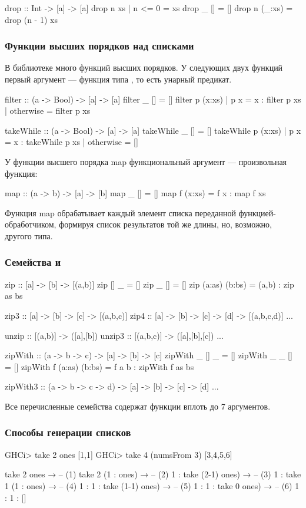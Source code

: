 \documentclass[11pt,a4paper]{article}
\begin{document}
\begin{hscode}
drop :: Int -> [a] -> [a]
drop n xs | n <= 0 = xs
drop _ []          = []
drop n (_:xs)      = drop (n - 1) xs
\end{hscode}

\subsubsection{Функции высших порядков над списками}
В библиотеке  много функций высших порядков. У следующих двух функций первый аргумент --- функция типа , то есть унарный предикат.
\begin{hscode}
filter :: (a -> Bool) -> [a] -> [a]
filter _ [] = []
filter p (x:xs) 
  | p x = x : filter p xs
  | otherwise = filter p xs

takeWhile :: (a -> Bool) -> [a] -> [a]
takeWhile _ [] = []
takeWhile p (x:xs)
  | p x = x : takeWhile p xs
  | otherwise = []
\end{hscode}
У функции высшего порядка map функциональный аргумент — произвольная функция:
\begin{hscode}
map :: (a -> b) -> [a] -> [b]
map _ [] = []
map f (x:xs) = f x : map f xs
\end{hscode}

Функция map обрабатывает каждый элемент списка переданной функцией-обработчиком, формируя список результатов той же длины, но, возможно, другого типа.
\subsubsection{Семейства  и }
\begin{hscode}
zip :: [a] -> [b] -> [(a,b)]
zip [] _ = []
zip _ [] = []
zip (a:as) (b:bs) = (a,b) : zip as bs

zip3 :: [a] -> [b] -> [c] -> [(a,b,c)]
zip4 :: [a] -> [b] -> [c] -> [d] -> [(a,b,c,d)]
...

unzip :: [(a,b)] -> ([a],[b])
unzip3 :: [(a,b,c)] -> ([a],[b],[c])
...

zipWith :: (a -> b -> c) -> [a] -> [b] -> [c]
zipWith _ [] _ = []
zipWith _ _ [] = []
zipWith f (a:as) (b:bs) = f a b : zipWith f as bs

zipWith3 :: (a -> b -> c -> d) -> [a] -> [b] -> [c] -> [d]
...
\end{hscode}
Все перечисленные семейства содержат функции вплоть до 7 аргументов.
\subsubsection{Способы генерации списков}
\begin{hscode}
GHCi> take 2 ones
[1,1]
GHCi> take 4 (numsFrom 3)
[3,4,5,6]

take 2 ones → -- (1)
take 2 (1 : ones) → -- (2)
1 : take (2-1) ones) → -- (3)
1 : take 1 (1 : ones) → -- (4)
1 : 1 : take (1-1) ones) → -- (5)
1 : 1 : take 0 ones) → -- (6)
1 : 1 : []
\end{hscode}
\end{document}
